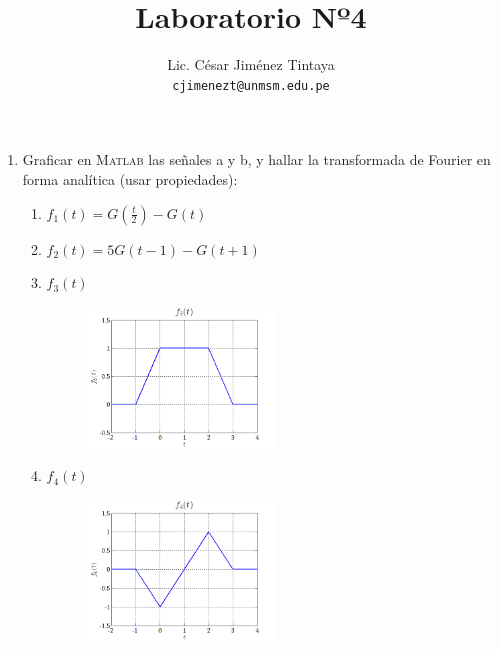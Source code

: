 \documentclass[a4paper,11pt,final]{article}
\begin{document}
  \title{Laboratorio Nº4}
  \author{Lic. César Jiménez Tintaya\\ \small{\texttt{cjimenezt@unmsm.edu.pe}}}
  \date{}
  \maketitle

  \begin{enumerate}
    \item Graficar en \textsc{Matlab} las señales a y b, y hallar
      la transformada de Fourier en forma analítica (usar propiedades):

      \begin{enumerate}
        \item $f_1\left(t\right) = G\left(\frac{t}{2}\right) - G\left(t\right)$
        \item $f_2\left(t\right) = 5G\left(t-1\right) - G\left(t+1\right)$
        \item $f_3\left(t\right)$

          \begin{figure}[H]
            \begin{center}
              \includegraphics[width=0.5\textwidth]{./lab4prob1c.png}
            \end{center}
          \end{figure}\vspace{-1.5em}

        \item $f_4\left(t\right)$

          \begin{figure}[H]
            \begin{center}
              \includegraphics[width=0.5\textwidth]{./lab4prob1d.png}
            \end{center}
          \end{figure}\vspace{-1.5em}
      \end{enumerate}


\end{enumerate}
\end{document}
